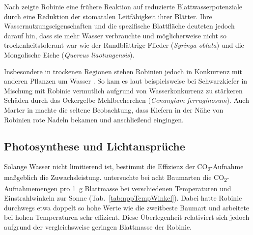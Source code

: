 \documentclass[twocolumn]{scrartcl}
\begin{document}
Nach \citet{yan2009robinieVergleich} zeigte Robinie eine frühere Reaktion auf reduzierte Blattwasserpotenziale durch eine Reduktion der stomatalen Leitfähigkeit ihrer Blätter. Ihre Wassernutzungseigenschaften und die spezifische Blattfläche deuteten jedoch darauf hin, dass sie mehr Wasser verbrauchte und möglicherweise nicht so trockenheitstolerant war wie der Rundblättrige Flieder (\emph{Syringa oblata}) und die Mongolische Eiche (\emph{Quercus liaotungensis}).

Insbesondere in trockenen Regionen stehen Robinien jedoch in Konkurrenz mit anderen Pflanzen um Wasser \citep{halasz2021robinieAlsTierutter}. So kam es laut \citet[S.~96]{donaubauer1974kiefernsterben} beispielsweise bei Schwarzkiefer in Mischung mit Robinie vermutlich aufgrund von Wasserkonkurrenz zu stärkeren Schäden durch das Ockergelbe Mehlbecherchen (\emph{Cenangium ferruginosum}).
Auch Marter in \citet[S.~93]{erteld1952robinieErtrag} machte die seltene Beobachtung, dass Kiefern in der Nähe von Robinien rote Nadeln bekamen und anschließend eingingen.

\subsection{Photosynthese und Lichtansprüche}

Solange Wasser nicht limitierend ist, bestimmt die Effizienz der CO\textsubscript{2}-Aufnahme maßgeblich die Zuwachsleistung. \citet{lubimenko1906npp} untersuchte bei acht Baumarten die CO\textsubscript{2}-Aufnahmemengen pro \SI{1}{\gram} Blattmasse bei verschiedenen Temperaturen und Einstrahlwinkeln zur Sonne (Tab.~\ref{tab:nppTempWinkel}). Dabei hatte Robinie durchwegs etwa doppelt so hohe Werte wie die zweitbeste Baumart und arbeitete bei hohen Temperaturen sehr effizient. Diese Überlegenheit relativiert sich jedoch aufgrund der vergleichsweise geringen Blattmasse der Robinie.
\end{document}
